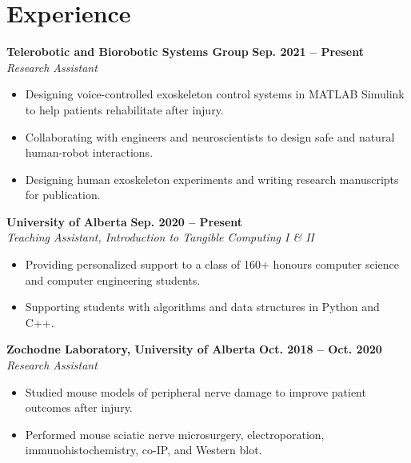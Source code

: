 \documentclass{article}
\begin{document}
\section*{\textcolor{my_colour}{Experience}}
\vspace{-.25em} \hrulefill \vspace{.25em}

\textbf{Telerobotic and Biorobotic Systems Group} \hfill \textbf{Sep. 2021 -- Present}\\
\textit{Research Assistant}
\begin{itemize}
    \item Designing voice-controlled exoskeleton control systems in MATLAB Simulink to help patients rehabilitate after injury.
    \item Collaborating with engineers and neuroscientists to design safe and natural human-robot interactions.
    \item Designing human exoskeleton experiments and writing research manuscripts for publication.
\end{itemize} \vspace{1em}

\textbf{University of Alberta} \hfill \textbf{Sep. 2020 -- Present}\\
\textit{Teaching Assistant, Introduction to Tangible Computing I \& II}
\begin{itemize}
    \item Providing personalized support to a class of 160+ honours computer science and computer engineering students.
    \item Supporting students with algorithms and data structures in Python and C++.
\end{itemize} \vspace{1em}

\textbf{Zochodne Laboratory, University of Alberta} \hfill \textbf{Oct. 2018 -- Oct. 2020}\\
\textit{Research Assistant}
\begin{itemize}
    \item Studied mouse models of peripheral nerve damage to improve patient outcomes after injury.
    \item Performed mouse sciatic nerve microsurgery, electroporation, immunohistochemistry, co-IP, and Western blot.
\end{itemize}
\end{document}
